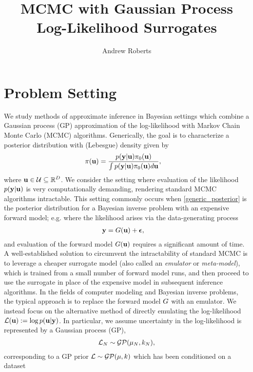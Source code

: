 \documentclass[12pt]{article}
\title{MCMC with Gaussian Process Log-Likelihood Surrogates}
\author{Andrew Roberts}
\begin{document}
\maketitle

\section{Problem Setting}
We study methods of approximate inference in Bayesian settings which combine a Gaussian process (GP) approximation of the log-likelihood 
with Markov Chain Monte Carlo (MCMC) algorithms. Generically, the goal is to characterize a posterior distribution with (Lebesgue) density 
given by 
\begin{align}
\postDens(\bpar) &= \frac{p(\dataOut|\bpar)\priorDens(\bpar)}{\int p(\dataOut|\bpar)\priorDens(\bpar) d\bpar}, \label{generic_posterior}
\end{align}
where $\bpar \in \parSpace \subseteq \R^{\Npar}$. We consider the setting where evaluation of the likelihood $p(\dataOut|\bpar)$ is very 
computationally demanding, rendering standard MCMC algorithms intractable. This setting commonly occurs when \ref{generic_posterior} is the 
posterior distribution for a Bayesian inverse problem with an expensive forward model; e.g. where the likelihood arises via the data-generating 
process 
\begin{align*}
\dataOut &= \fwd(\bpar) + \boldsymbol{\epsilon},
\end{align*}
and evaluation of the forward model $\fwd(\bpar)$ requires a significant amount of time. A well-established solution to circumvent the intractability of standard MCMC is 
to leverage a cheaper surrogate model (also called an \textit{emulator} or \textit{meta-model}), which is trained from a small number of forward model 
runs, and then proceed to use the surrogate in place of the expensive model in subsequent inference algorithms. In the fields of computer modeling and 
Bayesian inverse problems, the typical approach is to replace the forward model $\fwd$ with an emulator. We instead focus on the alternative 
method of directly emulating the log-likelihood $\llik(\bpar) := \log p(\bpar|\dataOut)$. In particular, we assume uncertainty in the log-likelihood is represented by a Gaussian 
process (GP), 
\begin{align}
\llik_{\Ndesign} \sim \GP(\GPMeanPred[\Ndesign], \GPKerPred[\Ndesign]),
\end{align}
corresponding to a GP prior $\llik \sim \GP(\GPMean, \GPKer)$ which has been conditioned on a dataset 
\end{document}
